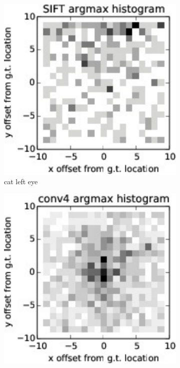 \documentclass{article} %
\begin{document}
\begin{figure}[t]
\begin{minipage}{0.4\textwidth}
\begin{subfigure}{0.45\textwidth}
\includegraphics[width=\textwidth]{figures/fine_cat_eye_sift.pdf}
\caption{cat left eye}
\end{subfigure}
\hspace{1em}
\begin{subfigure}{0.45\textwidth}
\includegraphics[width=\textwidth]{figures/fine_cat_nose_conv4.pdf}


\end{subfigure}
\end{minipage}
\end{figure}
\end{document}
